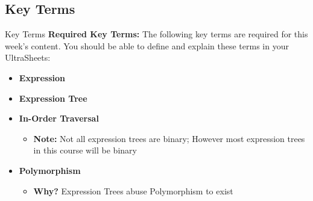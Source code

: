 \documentclass[hyperref={colorlinks,citecolor=blue,linkcolor=blue,urlcolor=blue}, aspectratio=1610]{beamer}
\begin{document}
\subsection{Key Terms}
\begin{frame}{Key Terms}
  \textbf{Required Key Terms:} The following key terms are required for this week's content. You should be able to define and explain these terms in your UltraSheets\texttrademark{}:
  \begin{itemize}
    \item \textbf{Expression}
    \item \textbf{Expression Tree}
    \item \textbf{In-Order Traversal}
    \begin{itemize}
      \item \textbf{Note:} Not all expression trees are binary; However most expression trees in this course will be binary
    \end{itemize}
  \item \textbf{Polymorphism}
  \begin{itemize}
    \item \textbf{Why?} Expression Trees abuse Polymorphism to exist
  \end{itemize}
  \end{itemize}
\end{frame}


\end{document}

